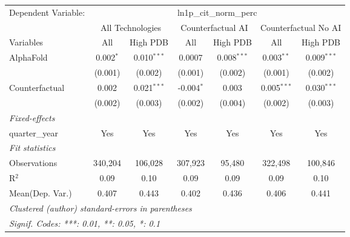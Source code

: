 \begingroup
\centering
\begin{tabular}{lcccccc}
   \tabularnewline \midrule \midrule
   Dependent Variable: & \multicolumn{6}{c}{ln1p\_cit\_norm\_perc}\\
 & \multicolumn{2}{c}{All Technologies} & \multicolumn{2}{c}{Counterfactual AI} & \multicolumn{2}{c}{Counterfactual No AI} \\
\cmidrule(lr){1-1}\cmidrule(lr){2-3} \cmidrule(lr){4-5} \cmidrule(lr){6-7}
Variables & \multicolumn{1}{c}{All} & \multicolumn{1}{c}{High PDB} & \multicolumn{1}{c}{All} & \multicolumn{1}{c}{High PDB} & \multicolumn{1}{c}{All} & \multicolumn{1}{c}{High PDB} \\
\cmidrule(lr){1-1}\cmidrule(lr){2-2} \cmidrule(lr){3-3} \cmidrule(lr){4-4} \cmidrule(lr){5-5} \cmidrule(lr){6-6} \cmidrule(lr){7-7}
   AlphaFold      & 0.002$^{*}$ & 0.010$^{***}$ & 0.0007       & 0.008$^{***}$ & 0.003$^{**}$  & 0.009$^{***}$\\   
                  & (0.001)     & (0.002)       & (0.001)      & (0.002)       & (0.001)       & (0.002)\\   
   Counterfactual & 0.002       & 0.021$^{***}$ & -0.004$^{*}$ & 0.003         & 0.005$^{***}$ & 0.030$^{***}$\\   
                  & (0.002)     & (0.003)       & (0.002)      & (0.004)       & (0.002)       & (0.003)\\   
   \midrule
   \emph{Fixed-effects}\\
   quarter\_year  & Yes         & Yes           & Yes          & Yes           & Yes           & Yes\\  
   \midrule
   \emph{Fit statistics}\\
   Observations   & 340,204     & 106,028       & 307,923      & 95,480        & 322,498       & 100,846\\  
   R$^2$          & 0.09        & 0.10          & 0.09         & 0.09          & 0.09          & 0.10\\  
Mean(Dep. Var.) & 0.407 & 0.443 & 0.402 & 0.436 & 0.406 & 0.441 \\
   \midrule \midrule
   \multicolumn{7}{l}{\emph{Clustered (author) standard-errors in parentheses}}\\
   \multicolumn{7}{l}{\emph{Signif. Codes: ***: 0.01, **: 0.05, *: 0.1}}\\
\end{tabular}
\par\endgroup
